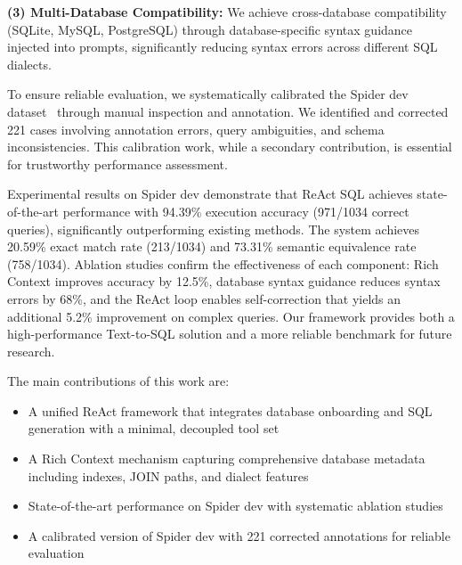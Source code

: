 \textbf{(3) Multi-Database Compatibility:} We achieve cross-database compatibility (SQLite, MySQL, PostgreSQL) through database-specific syntax guidance injected into prompts, significantly reducing syntax errors across different SQL dialects.

To ensure reliable evaluation, we systematically calibrated the Spider dev dataset~\cite{yu2018spider} through manual inspection and annotation. We identified and corrected 221 cases involving annotation errors, query ambiguities, and schema inconsistencies. This calibration work, while a secondary contribution, is essential for trustworthy performance assessment.

Experimental results on Spider dev demonstrate that ReAct SQL achieves state-of-the-art performance with 94.39\% execution accuracy (971/1034 correct queries), significantly outperforming existing methods. The system achieves 20.59\% exact match rate (213/1034) and 73.31\% semantic equivalence rate (758/1034). Ablation studies confirm the effectiveness of each component: Rich Context improves accuracy by 12.5\%, database syntax guidance reduces syntax errors by 68\%, and the ReAct loop enables self-correction that yields an additional 5.2\% improvement on complex queries. Our framework provides both a high-performance Text-to-SQL solution and a more reliable benchmark for future research.

The main contributions of this work are:
\begin{itemize}
    \item A unified ReAct framework that integrates database onboarding and SQL generation with a minimal, decoupled tool set
    \item A Rich Context mechanism capturing comprehensive database metadata including indexes, JOIN paths, and dialect features
    \item State-of-the-art performance on Spider dev with systematic ablation studies
    \item A calibrated version of Spider dev with 221 corrected annotations for reliable evaluation
\end{itemize}
